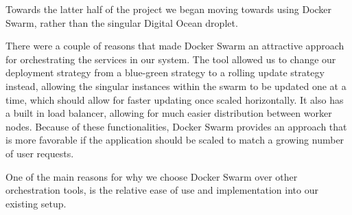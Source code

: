 Towards the latter half of the project we began moving towards using Docker Swarm, rather than the singular Digital Ocean droplet.

There were a couple of reasons that made Docker Swarm an attractive approach for orchestrating the services in our system. The tool allowed us to change our deployment strategy from a blue-green strategy to a rolling update strategy instead, allowing the singular instances within the swarm to be updated one at a time, which should allow for faster updating once scaled horizontally. It also has a built in load balancer, allowing for much easier distribution between worker nodes. Because of these functionalities, Docker Swarm provides an approach that is more favorable if the application should be scaled to match a growing number of user requests.

One of the main reasons for why we choose Docker Swarm over other orchestration tools, is the relative ease of use and implementation into our existing setup.
